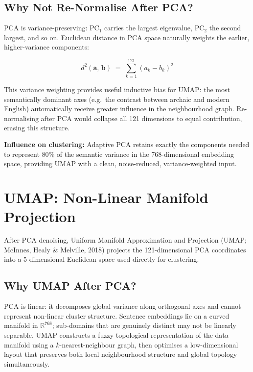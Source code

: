\documentclass[11pt, a4paper]{article}
\begin{document}
\subsection{Why Not Re-Normalise After PCA?}

PCA is variance-preserving: PC$_1$ carries the largest eigenvalue, PC$_2$ the
second largest, and so on.  Euclidean distance in PCA space naturally weights
the earlier, higher-variance components:

\begin{mathbox}
\[
  d^{2}(\mathbf{a},\,\mathbf{b})
  \;=\;
  \sum_{k=1}^{121}(a_k - b_k)^{2}
\]
\end{mathbox}

This variance weighting provides useful inductive bias for UMAP: the most
semantically dominant axes (e.g.\ the contrast between archaic and modern
English) automatically receive greater influence in the neighbourhood graph.
Re-normalising after PCA would collapse all 121 dimensions to equal
contribution, erasing this structure.

\begin{insightbox}
\textbf{Influence on clustering:} Adaptive PCA retains exactly the components
needed to represent 80\% of the semantic variance in the 768-dimensional
embedding space, providing UMAP with a clean, noise-reduced,
variance-weighted input.
\end{insightbox}

\section{UMAP: Non-Linear Manifold Projection}

After PCA denoising, Uniform Manifold Approximation and Projection (UMAP;
McInnes, Healy \& Melville, 2018) projects the 121-dimensional PCA
coordinates into a 5-dimensional Euclidean space used directly for clustering.

\subsection{Why UMAP After PCA?}

PCA is linear: it decomposes global variance along orthogonal axes and cannot
represent non-linear cluster structure.  Sentence embeddings lie on a curved
manifold in $\mathbb{R}^{768}$; sub-domains that are genuinely distinct may
not be linearly separable.  UMAP constructs a fuzzy topological representation
of the data manifold using a $k$-nearest-neighbour graph, then optimises a
low-dimensional layout that preserves both local neighbourhood structure and
global topology simultaneously.
\end{document}
